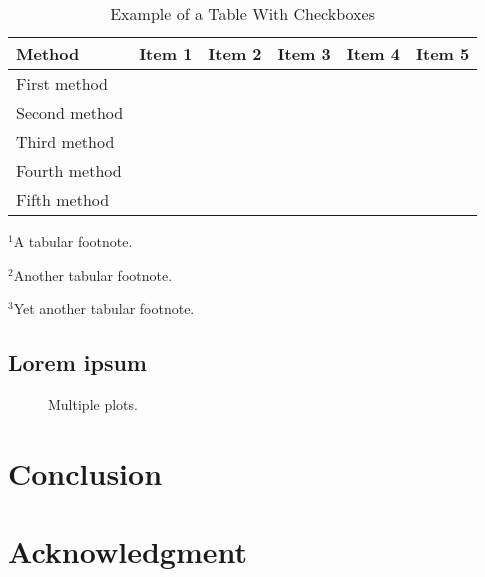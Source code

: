 \documentclass[conference]{IEEEtran}
\begin{document}
\begin{table}[!t]
\centering
\begin{threeparttable}
\renewcommand{\arraystretch}{1.25}
\setlength\tabcolsep{0.24em}
\caption{Example of a Table With Checkboxes}
\label{table_example}
\centering
\begin{tabular}{l|ccccc}
\vspace{-0.3em}
Method & Item 1 & Item 2 & Item 3 & Item 4 & Item 5 \tabularnewline
\hline
First method \cite{Andrews2012,Andrews2010a} & \y[1] & \y & \y[2] & \n & \n \tabularnewline
Second method \cite{Muratore2019} & \n & \y & \y[2] & \y & \n \tabularnewline
Third method \cite{Kwon2018,Maas2003} & \y[3] & \n & \n & \y & \n \tabularnewline
Fourth method \cite{Hameed2018,Hameed2015,Hammler2014} & \y[1] & \y & \y[2] & \y & \y \tabularnewline
Fifth method \cite{Klumperink2017} & \y & \y & \n & \y & \y \tabularnewline
\end{tabular}
\begin{tablenotes}
\scriptsize
  \item $^1$A tabular footnote.
  \item $^2$Another tabular footnote.
  \item $^3$Yet another tabular footnote.
\end{tablenotes}
\end{threeparttable}
\end{table}


\subsection{Lorem ipsum}
\lipsum[14-15]
\lipsum[16][1-8]

\begin{figure}[!t]
\centering

\caption{Multiple plots.}
\label{fig_multi}
\vspace{-0.4em}
\end{figure}


\section{Conclusion}
\label{section_concl}
\lipsum[20]


\section*{Acknowledgment}
\lipsum[50][1-2]





\end{document}
